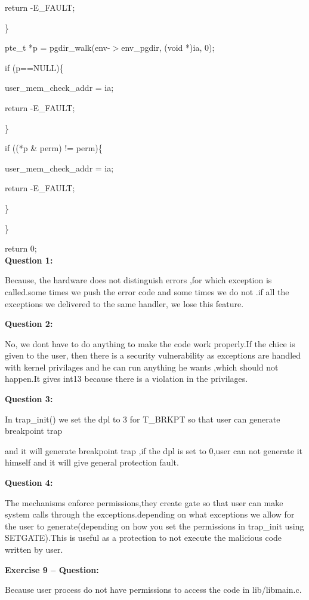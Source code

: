 \documentclass[a4paper,portrait,12pt]{article}
\begin{document}
			return -E\_FAULT;


		\}


		pte\_t *p = pgdir\_walk(env-$>$env\_pgdir, (void *)ia, 0);


		if (p==NULL)\{


			user\_mem\_check\_addr = ia;


			return -E\_FAULT;


		\}


		if ((*p \& perm) != perm)\{


			user\_mem\_check\_addr = ia;


			return -E\_FAULT;



		\}


	\}


	return 0;\\




\textbf{Question 1:}





Because, the hardware does not distinguish errors ,for which exception is called.some times we push the error code and some times we do not .if all the exceptions we delivered to the same handler, we lose this feature.





\textbf{Question 2:}





No, we dont have to do anything to make the code work properly.If the chice is given to the user, then there is a security vulnerability as exceptions are handled with kernel privilages and he can run anything he wants ,which should not happen.It gives int13 because there is a violation in the privilages.





\textbf{Question 3:}





In trap\_init() we set the dpl to 3 for T\_BRKPT so that user can generate breakpoint trap


and it will generate breakpoint trap ,if the dpl is set to 0,user can not generate it himself and it will give general protection fault.





\textbf{Question 4:}





The mechanisms enforce permissions,they create gate so that user can make system calls through the exceptions.depending on what exceptions we allow for the user to generate(depending on how you set the permissions in trap\_init using SETGATE).This is useful as a protection to not execute the malicious code written by user.





\textbf{Exercise 9 -- Question:}


Because user process do not have permissions to access the code in lib/libmain.c.
\end{document}
